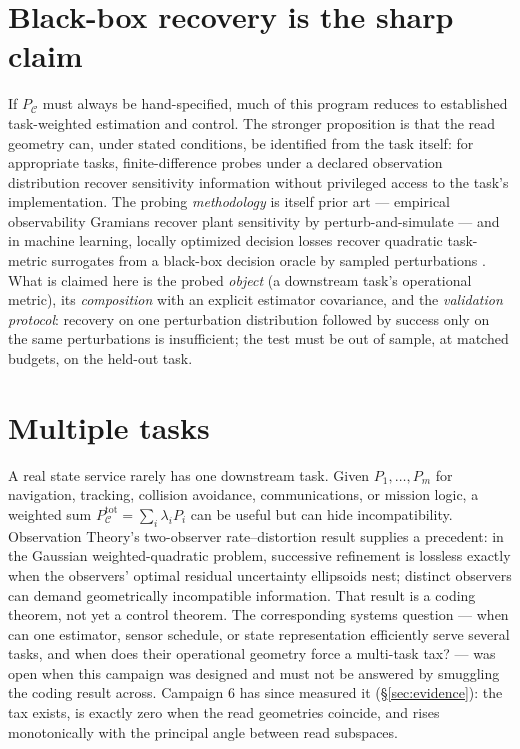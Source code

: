 \documentclass[letterpaper,onecolumn]{IEEEtran}
\theoremstyle{definition}
\theoremstyle{remark}
\newcommand{\PC}{P_{\mathcal{C}}}
\begin{document}
\section{Black-box recovery is the sharp claim}
\label{sec:recovery}

If $\PC$ must always be hand-specified, much of this program reduces to
established task-weighted estimation and control. The stronger proposition is
that the read geometry can, under stated conditions, be identified from the
task itself: for appropriate tasks, finite-difference probes under a
declared observation distribution recover sensitivity information without
privileged access to the task's implementation. The probing
\emph{methodology} is itself prior art --- empirical observability Gramians
recover plant sensitivity by perturb-and-simulate \cite{krenderide2009} ---
and in machine learning, locally optimized decision losses recover quadratic
task-metric surrogates from a black-box decision oracle by sampled
perturbations \cite{shah2022,shah2024}. What is claimed here is the probed
\emph{object} (a downstream task's operational metric), its
\emph{composition} with an explicit estimator covariance, and the
\emph{validation protocol}: recovery on one perturbation distribution
followed by success only on the same perturbations is insufficient; the test
must be out of sample, at matched budgets, on the held-out task.

\section{Multiple tasks}
\label{sec:multi}

A real state service rarely has one downstream task. Given
$P_1,\dots,P_m$ for navigation, tracking, collision avoidance,
communications, or mission logic, a weighted sum $\PC^{\mathrm{tot}}=\sum_i
\lambda_i P_i$ can be useful but can hide incompatibility. Observation
Theory's two-observer rate--distortion result supplies a precedent: in the
Gaussian weighted-quadratic problem, successive refinement is lossless
exactly when the observers' optimal residual uncertainty ellipsoids nest;
distinct observers can demand geometrically incompatible information. That
result is a coding theorem, not yet a control theorem. The corresponding
systems question --- when can one estimator, sensor schedule, or state
representation efficiently serve several tasks, and when does their
operational geometry force a multi-task tax? --- was open when this
campaign was designed and must not be answered by smuggling the coding
result across. Campaign 6 has since measured it (\S\ref{sec:evidence}):
the tax exists, is exactly zero when the read geometries coincide, and
rises monotonically with the principal angle between read subspaces.
\end{document}
